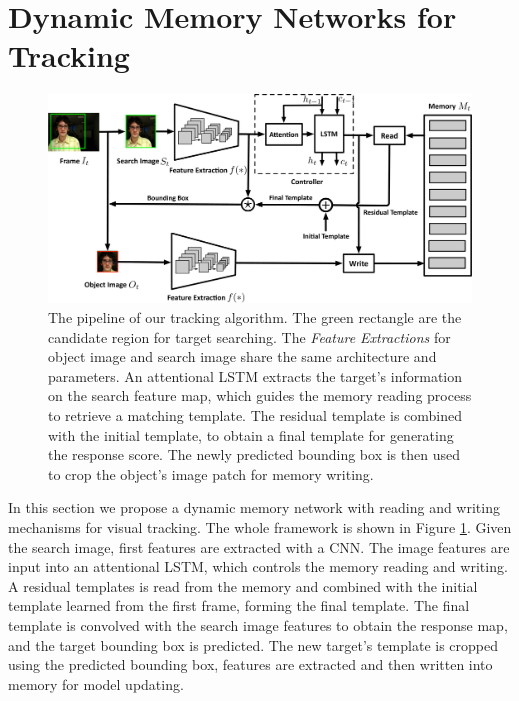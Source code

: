 \documentclass[runningheads]{llncs}
\begin{document}
\section{Dynamic Memory Networks for Tracking}

\begin{figure}[t]
	\begin{center}
		\includegraphics[width=0.95\linewidth]{framework.pdf}
	\end{center}
	\vspace{-3mm}
	\caption{The pipeline of our tracking algorithm. The green rectangle are the candidate region for target searching. The \textit{Feature Extractions} for object image and search image share the same architecture and parameters. An attentional LSTM extracts the target's information on the search feature map, which guides the memory reading process to retrieve a matching template.  The residual  template is combined with the initial template, to obtain a final template for generating the response score. The newly predicted bounding box is then used to crop the object's image patch for memory writing. 
	}
	\vspace{-2mm}
	\label{fig:2}
\end{figure}

In this section we propose a dynamic memory network with reading and writing mechanisms for visual tracking. 
The whole framework is shown in Figure \ref{fig:2}.
Given the search image, first features are extracted with a CNN.
The image features are input into an attentional LSTM, which controls the memory reading and writing. 
A residual templates is read from the memory and combined with the initial template learned from the first frame, forming the final template.  The final template is convolved with the search image features to obtain the response map, and the target bounding box is predicted.
The new target's template is cropped using the predicted bounding box, features are extracted and then written into memory for model updating. 
\end{document}
